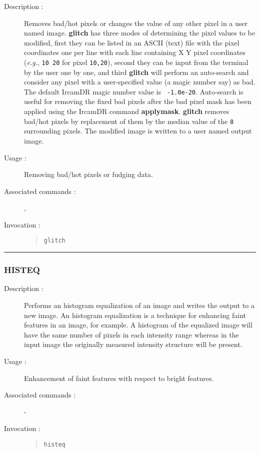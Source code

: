 \begin{description}

\item[Description :] Removes bad/hot pixels or changes the value of any
other pixel in a user named image.  {\bf glitch} has three modes of
determining the pixel values to be modified, first they can be listed
in an ASCII (text) file with the pixel coordinates one per line with
each line containing X Y pixel coordinates (\emph{e.g.}, {\tt 10 20}
for pixel {\tt 10,20}), second they can be input from the terminal by
the user one by one, and third {\bf glitch} will perform an auto-search
and consider any pixel with a user-specified value (a magic number say)
as bad.  The default {\sc IrcamDR} magic number value is {\tt
-1.0e-20}.  Auto-search is useful for removing the fixed bad pixels
after the bad pixel mask has been applied using the {\sc IrcamDR}
command {\bf applymask}.  {\bf glitch} removes bad/hot pixels by
replacement of them by the median value of the {\tt 8} surrounding
pixels.  The modified image is written to a user named output image.

\item[Usage :] Removing bad/hot pixels or fudging data.
\item[Associated commands :] {\tt {}}, 
{\tt {}}
\item[Invocation :]

\begin{quote}{\tt  glitch }\end{quote}

\end{description}

\hrule 
\subsubsection*{\label{HISTEQ}HISTEQ}

\begin{description}

\item[Description :] Performs an histogram equalization of an image and
writes the output to a new image.  An histogram equalization is a
technique for enhancing faint features in an image, for example.  A
histogram of the equalized image will have the same number of pixels in
each intensity range whereas in the input image the originally measured
intensity structure will be present.

\item[Usage :] Enhancement of faint features with respect to bright features.
\item[Associated commands :] -
\item[Invocation :]

\begin{quote}{\tt  histeq }\end{quote}

\end{description}

